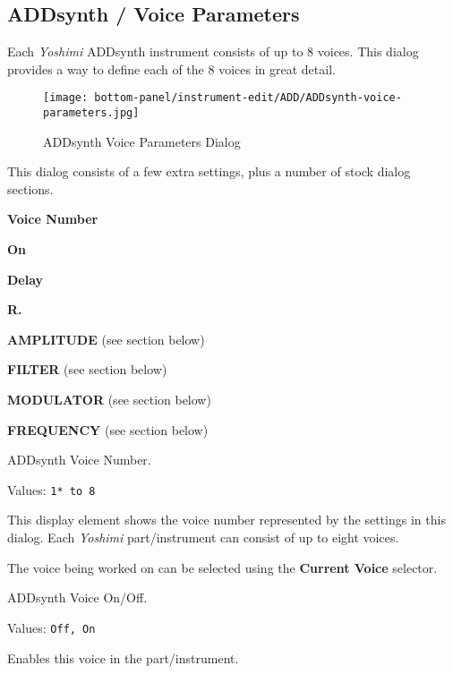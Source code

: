 \subsection{ADDsynth / Voice Parameters}
\label{subsec:addsynth_voice_parameters}

   Each \textsl{Yoshimi} ADDsynth instrument consists of up to 8 voices.
   This dialog provides a way to define each of the 8 voices in great
   detail.

\begin{figure}[H]
   \centering 
   \texttt{[image: bottom-panel/instrument-edit/ADD/ADDsynth-voice-parameters.jpg]}
   \caption{ADDsynth Voice Parameters Dialog}
   \label{fig:addsynth_voice_parameters_dialog}
\end{figure}

   This dialog consists of a few extra settings, plus a number of
   stock dialog sections.

   \begin{enumber}
      \item \textbf{Voice Number}
      \item \textbf{On}
      \item \textbf{Delay}
      \item \textbf{R.}
      \item \textbf{AMPLITUDE} (see section below)
      \item \textbf{FILTER} (see section below)
      \item \textbf{MODULATOR} (see section below)
      \item \textbf{FREQUENCY} (see section below)
   \end{enumber}

   \setcounter{ItemCounter}{0}      %

   ADDsynth Voice Number.

   Values: \texttt{1* to 8}

   This display element shows the voice number represented by the settings
   in this dialog.  Each \textsl{Yoshimi} part/instrument can consist of up
   to eight voices.

   The voice being worked on can be selected using the
   \textbf{Current Voice} selector.

   ADDsynth Voice On/Off.

   Values: \texttt{Off, On}

   Enables this voice in the part/instrument.


